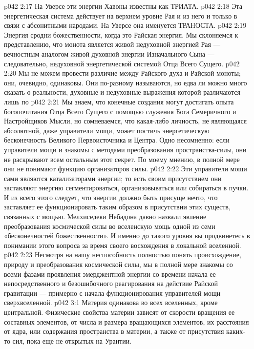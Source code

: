 \vs p042 2:17 На Уверсе эти энергии Хавоны известны как ТРИАТА.
\vs p042 2:18 \pc {}\bibnobreakspace {} Эта энергетическая система действует на верхнем уровне Рая и из него и только в связи с абсонитными народами. На Уверсе она именуется ТРАНОСТА.
\vs p042 2:19 \pc {}\bibnobreakspace {} Энергия сродни божественности, когда это Райская энергия. Мы склоняемся к представлению, что монота является живой недуховной энергией Рая --- вечностным аналогом живой духовной энергии Изначального Сына --- следовательно, недуховной энергетической системой Отца Всего Сущего.
\vs p042 2:20 Мы не можем провести различие между  Райского духа и Райской моноты; они, очевидно, одинаковы. Они по\hyp{}разному называются, но едва ли можно много сказать о реальности, духовные и недуховные выражения которой различаются лишь по 
\vs p042 2:21 \pc Мы знаем, что конечные создания могут достигать опыта богопочитания Отца Всего Сущего с помощью служения Бога Семеричного и Настройщиков Мысли, но сомневаемся, что какая\hyp{}либо личность, не являющаяся абсолютной, даже управители мощи, может постичь энергетическую бесконечность Великого Первоисточника и Центра. Одно несомненно: если управители мощи и знакомы с методами преобразования пространства\hyp{}силы, они не раскрывают всем остальным этот секрет. По моему мнению, в полной мере они не понимают функцию организаторов силы.
\vs p042 2:22 Эти управители мощи сами являются катализаторами энергии; то есть своим присутствием они заставляют энергию сегментироваться, организовываться или собираться в пучки. И из всего этого следует, что энергии должно быть присуще нечто, что заставляет ее функционировать таким образом в присутствии этих существ, связанных с мощью. Мелхиседеки Небадона давно назвали явление преобразования космической силы во вселенскую мощь одной из семи «бесконечностей божественности». И именно до такого уровня вы продвинетесь в понимании этого вопроса за время своего восхождения в локальной вселенной.
\vs p042 2:23 \pc Несмотря на нашу неспособность полностью понять происхождение, природу и преобразования космической силы, мы в полной мере знакомы со всеми фазами проявления эмерджентной энергии со времени начала ее непосредственного и безошибочного реагирования на действие Райской гравитации --- примерно с начала функционирования управителей мощи сверхвселенной.
\vs p042 3:1 Материя одинакова во всех вселенных, кроме центральной. Физические свойства материи зависят от скорости вращения ее составных элементов, от числа и размера вращающихся элементов, их расстояния от ядра, или содержания пространства в материи, а также от присутствия каких\hyp{}то сил, пока еще не открытых на Урантии.

